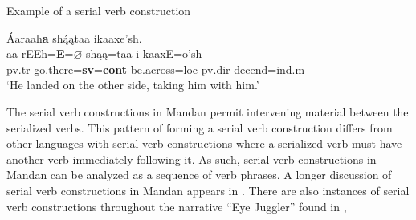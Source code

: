 \begin{exe}
    \item\label{SkSVC1} Example of a serial verb construction

    \glll Áaraah\textbf{a} shą́ątaa íkaaxe'sh.\\
    aa-rEEh=\textbf{E}=\textbf{$\varnothing$} shąą=taa i-kaaxE=o'sh\\
    pv.tr-\textnormal{go.there}=\textbf{sv}=\textbf{cont} \textnormal{be.across}=loc pv.dir-\textnormal{decend}=ind.m\\
    \glt `He landed on the other side, taking him with him.' \citep[5]{hollow1973b}

\end{exe}

The serial verb constructions in Mandan permit intervening material between the serialized verbs. This pattern of forming a serial verb construction differs from other languages with serial verb constructions where a serialized verb must have another verb immediately following it. As such, serial verb constructions in Mandan can be analyzed as a sequence of verb phrases. A longer discussion of serial verb constructions in Mandan appears in . There are also instances of serial verb constructions throughout the narrative ``Eye Juggler'' found in ,
